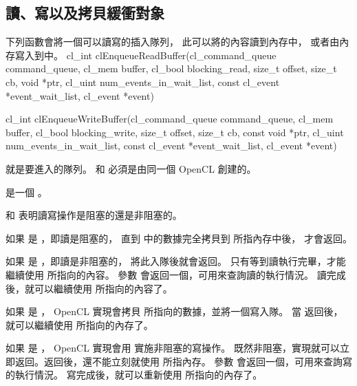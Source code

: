 \subsection{讀、寫以及拷貝緩衝對象}

下列函數會將一個可以讀寫的插入隊列，
此可以將的內容讀到內存中，
或者由內存寫入到中。
\startclc
cl_int clEnqueueReadBuffer(cl_command_queue command_queue,
			cl_mem buffer,
			cl_bool blocking_read,
			size_t offset,
			size_t cb,
			void *ptr,
			cl_uint num_events_in_wait_list,
			const cl_event *event_wait_list,
			cl_event *event)

cl_int clEnqueueWriteBuffer(cl_command_queue command_queue,
			cl_mem buffer,
			cl_bool blocking_write,
			size_t offset,
			size_t cb,
			const void *ptr,
			cl_uint num_events_in_wait_list,
			const cl_event *event_wait_list,
			cl_event *event)
\stopclc

 就是要進入的隊列。
 和  必須是由同一個 OpenCL 創建的。

 是一個 。

 和  表明讀寫操作是{\ftRef 阻塞}的還是{\ftRef 非阻塞}的。

如果  是 ，即讀是阻塞的，
直到  中的數據完全拷貝到  所指內存中後，  才會返回。

如果  是 ，即讀是非阻塞的，  將此入隊後就會返回。
只有等到讀執行完畢，才能繼續使用  所指向的內容。
參數  會返回一個，可用來查詢讀的執行情況。
讀完成後，就可以繼續使用  所指向的內容了。

如果  是 ， OpenCL 實現會拷貝  所指向的數據，並將一個寫入隊。
當  返回後，就可以繼續使用  所指向的內存了。

如果  是 ， OpenCL 實現會用  實施非阻塞的寫操作。
既然非阻塞，實現就可以立即返回。返回後，還不能立刻就使用  所指內存。
參數  會返回一個，可用來查詢寫的執行情況。
寫完成後，就可以重新使用  所指向的內存了。

